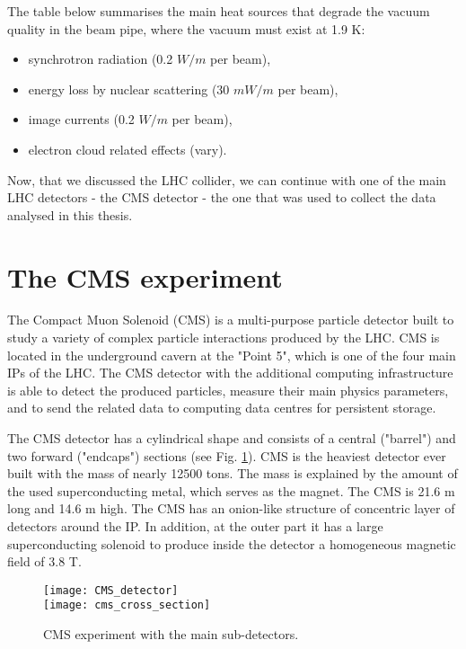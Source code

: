 \begin{normalsize}
The table below summarises the main heat sources that degrade the vacuum quality in the beam pipe, where the vacuum must exist at 1.9 K:


\begin{itemize}
\item synchrotron radiation (0.2 $W/m$ per beam),
\item energy loss by nuclear scattering (30 $mW/m$ per beam),
\item image currents (0.2 $W/m$ per beam),
\item electron cloud related effects (vary).
\end{itemize}



Now, that we discussed the LHC collider, we can continue with one of the main LHC detectors - the CMS detector - the one that was used to collect the data analysed in this thesis. 



\section{The CMS experiment}

                

The Compact Muon Solenoid (CMS) is a multi-purpose particle detector built to study a variety of complex particle interactions produced by the LHC. CMS is located in the underground cavern at the "Point 5", which is one of the four main IPs of the LHC. The CMS detector with the additional computing infrastructure is able to detect the produced particles, measure their main physics parameters, and to send the related data to computing data centres for persistent storage. 


The CMS detector has a cylindrical shape and consists of a central ("barrel") and two forward ("endcaps") sections (see Fig. \ref{CMS_detector}). 
CMS is the heaviest detector ever built with the mass of nearly 12500 tons. The mass is explained by the amount of the used superconducting metal, which serves as the magnet. The CMS is 21.6 m long and 14.6 m high. The CMS has an onion-like structure of concentric layer of detectors around the IP. In addition, at the outer part it has a large superconducting solenoid to produce inside the detector a homogeneous magnetic field of 3.8 T.

\begin{figure}[H]
  \centering
  \texttt{[image: CMS\_detector]}\\
  \vspace{1cm}
  \texttt{[image: cms\_cross\_section]}
  \caption{CMS experiment with the main sub-detectors.}
  \label{CMS_detector}
\end{figure}



\end{normalsize}
